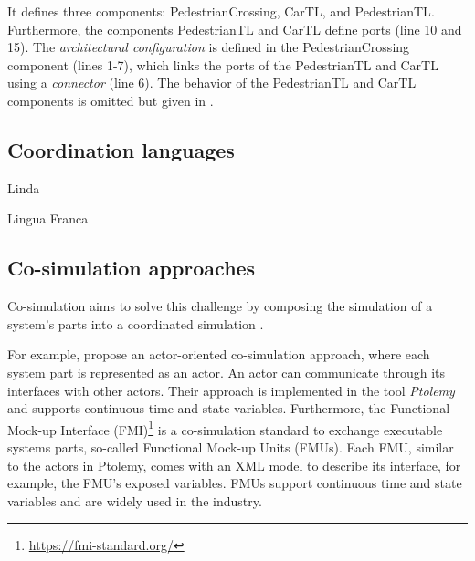 \documentclass[runningheads]{llncs}
\begin{document}
It defines three components: \textsf{PedestrianCrossing}, \textsf{CarTL}, and \textsf{PedestrianTL}.
Furthermore, the components \textsf{PedestrianTL} and \textsf{CarTL} define ports (line 10 and 15).
The \textit{architectural configuration} is defined in the \textsf{PedestrianCrossing} component (lines 1-7), which links the ports of the \textsf{PedestrianTL} and \textsf{CarTL} using a \textit{connector} (line 6).
The behavior of the \textsf{PedestrianTL} and \textsf{CarTL} components is omitted but given in \cite{timkrauterArtifactsCoordination2024}.

\subsection{Coordination languages}

Linda \cite{carrieroLindaContext1989}
\cite{papadopoulosCoordinationModelsLanguages1998}

Lingua Franca \cite{lohstrohLinguaFrancaDeterministic2021}

\subsection{Co-simulation approaches}
\cite{gomesCoSimulationSurvey2019} %

Co-simulation aims to solve this challenge by composing the simulation of a system's parts into a coordinated simulation \cite{gomesCoSimulationSurvey2019}.

For example, \cite{ekerTamingHeterogeneityPtolemy2003} propose an actor-oriented co-simulation approach, where each system part is represented as an actor.
An actor can communicate through its interfaces with other actors.
Their approach is implemented in the tool \textit{Ptolemy} and supports continuous time and state variables.
Furthermore, the Functional Mock-up Interface (FMI)\footnote{\url{https://fmi-standard.org/}} is a co-simulation standard to exchange executable systems parts, so-called Functional Mock-up Units (FMUs).
Each FMU, similar to the actors in Ptolemy, comes with an XML model to describe its interface, for example, the FMU's exposed variables.
FMUs support continuous time and state variables and are widely used in the industry.
\end{document}
